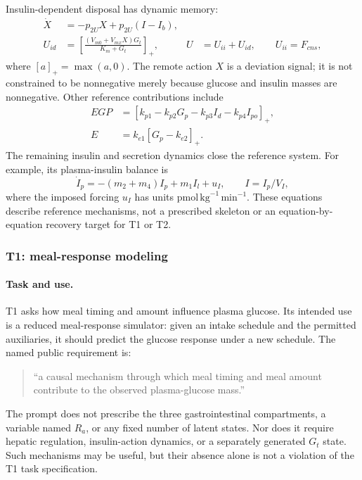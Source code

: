 Insulin-dependent disposal has dynamic memory:
\begin{align}
\dot X &= -p_{2U}X+p_{2U}(I-I_b), \\
U_{id} &= \left[\frac{(V_{m0}+V_{mx}X)G_t}{K_m+G_t}\right]_+,
& U &= U_{ii}+U_{id}, \qquad U_{ii}=F_{cns},
\end{align}
where $[a]_+=\max(a,0)$. The remote action $X$ is a deviation signal;
it is not constrained to be nonnegative merely because glucose and insulin
masses are nonnegative. Other reference contributions include
\begin{align}
EGP &= [k_{p1}-k_{p2}G_p-k_{p3}I_d-k_{p4}I_{po}]_+, \\
E &= k_{e1}[G_p-k_{e2}]_+.
\end{align}
The remaining insulin and secretion dynamics close the reference system.
For example, its plasma-insulin balance is
\begin{equation}
\dot I_p=-(m_2+m_4)I_p+m_1I_l+u_I,
\qquad I=I_p/V_I,
\end{equation}
where the imposed forcing $u_I$ has units
$\mathrm{pmol}\,\mathrm{kg}^{-1}\,\mathrm{min}^{-1}$.
These equations describe reference mechanisms, not a prescribed skeleton
or an equation-by-equation recovery target for T1 or T2.

\subsubsection{T1: meal-response modeling}
\label{app:benchmark_t1}

\paragraph{Task and use.}
T1 asks how meal timing and amount influence plasma glucose. Its intended use
is a reduced meal-response simulator: given an intake schedule and the permitted
auxiliaries, it should predict the glucose response under a new schedule.
The named public requirement is:
\begin{quote}
``a causal mechanism through which meal timing and meal amount contribute to
the observed plasma-glucose mass.''
\end{quote}
The prompt does not prescribe the three gastrointestinal compartments,
a variable named $R_a$, or any fixed number of latent states. Nor does it
require hepatic regulation, insulin-action dynamics, or a separately generated
$G_t$ state. Such mechanisms may be useful, but their absence alone is not a
violation of the T1 task specification.

